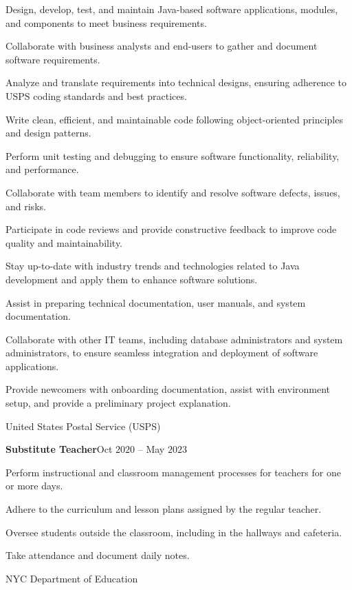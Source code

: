 \documentclass[a4paper, 12pt]{article}
\begin{document}
\begin{flushleft}
\begin{flushleft}
\begin{compactitem}
    \item Design, develop, test, and maintain Java-based software applications, modules, and components to meet business requirements.
    \item Collaborate with business analysts and end-users to gather and document software requirements.
    \item Analyze and translate requirements into technical designs, ensuring adherence to USPS coding standards and best practices.
    \item Write clean, efficient, and maintainable code following object-oriented principles and design patterns.
    \item Perform unit testing and debugging to ensure software functionality, reliability, and performance.
    \item Collaborate with team members to identify and resolve software defects, issues, and risks.
    \item Participate in code reviews and provide constructive feedback to improve code quality and maintainability.
    \item Stay up-to-date with industry trends and technologies related to Java development and apply them to enhance software solutions.
    \item Assist in preparing technical documentation, user manuals, and system documentation.
    \item Collaborate with other IT teams, including database administrators and system administrators, to ensure seamless integration and deployment of software applications.
    \item Provide newcomers with onboarding documentation, assist with environment setup, and provide a preliminary project explanation.
\end{compactitem}
    United States Postal Service (USPS)
\end{flushleft}

\begin{flushleft}
\textbf{Substitute Teacher}\hfill Oct $2020$ -- May $2023$\\
\begin{compactitem}
    \item Perform instructional and classroom management processes for teachers for one or more days.
    \item Adhere to the curriculum and lesson plans assigned by the regular teacher.
    \item Oversee students outside the classroom, including in the hallways and cafeteria.
    \item Take attendance and document daily notes.
\end{compactitem}
NYC Department of Education
\end{flushleft}


\end{flushleft}
\end{document}
